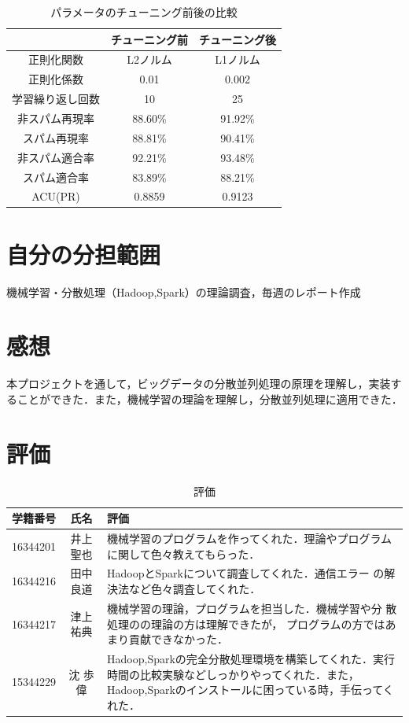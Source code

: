 \documentclass[a4paper,12pt]{jarticle}
\begin{document}
\begin{table}[hbt]
\centering
\caption{パラメータのチューニング前後の比較}
\label{tab:パラメータのチューニング前後の比較}
\fontsize{9pt}{10pt}\selectfont
\begin{tabular}{|c|c|c|} \hline
 &チューニング前&チューニング後 \\ \hline
正則化関数& L2ノルム & L1ノルム \\ \hline
正則化係数&0.01 & 0.002 \\ \hline
学習繰り返し回数  &10 & 25  \\ \hline \hline
非スパム再現率& 88.60\%& 91.92\% \\ \hline
スパム再現率& 88.81\%& 90.41\% \\ \hline
非スパム適合率& 92.21\%& 93.48\% \\ \hline
スパム適合率& 83.89\%& 88.21\% \\ \hline
ACU(PR)& 0.8859 &0.9123 \\ \hline
\end{tabular}
\end{table}

\section{自分の分担範囲}
機械学習・分散処理（Hadoop,Spark）の理論調査，毎週のレポート作成
\section{感想}
本プロジェクトを通して，ビッグデータの分散並列処理の原理を理解し，実装す
ることができた．また，機械学習の理論を理解し，分散並列処理に適用できた．
\section{評価}
\begin{table}[hbtp]
\centering
\caption{評価}
\label{tab:評価}
\fontsize{9pt}{10pt}\selectfont
\begin{tabular}{c|c||l} \hline
 学籍番号&氏名     &評価   \\ \hline \hline
16344201&井上 聖也&機械学習のプログラムを作ってくれた．理論やプログラム
		 に関して色々教えてもらった．\\ \hline
16344216&田中 良道& HadoopとSparkについて調査してくれた．通信エラー
		 の解決法など色々調査してくれた．\\ \hline
 16344217&津上 祐典& 機械学習の理論，プログラムを担当した．機械学習や分
		 散処理のの理論の方は理解できたが，
 プログラムの方ではあまり貢献できなかった．\\ \hline 
15344229&沈 歩偉　& Hadoop,Sparkの完全分散処理環境を構築してくれた．実行
		 時間の比較実験などしっかりやってくれた．また，
		 Hadoop,Sparkのインストールに困っている時，手伝ってくれた． \\ \hline
\end{tabular}
\end{table}
\end{document}
